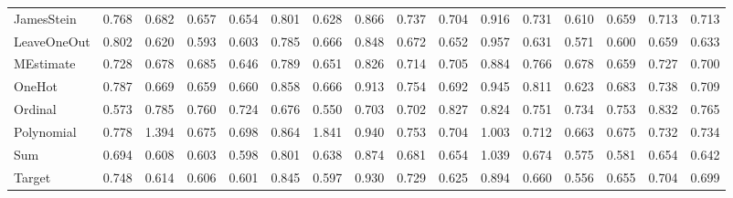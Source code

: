 \begin{tabular}{lrrrrrrrrrrrrrrr}
JamesStein         &     0.768 &             0.682 &   0.657 &    0.654 &   0.801 &    0.628 &  0.866 &   0.737 &    0.704 &    0.916 &      0.731 &      0.610 &      0.659 &           0.713 &  0.713 \\
LeaveOneOut        &     0.802 &             0.620 &   0.593 &    0.603 &   0.785 &    0.666 &  0.848 &   0.672 &    0.652 &    0.957 &      0.631 &      0.571 &      0.600 &           0.659 &  0.633 \\
MEstimate          &     0.728 &             0.678 &   0.685 &    0.646 &   0.789 &    0.651 &  0.826 &   0.714 &    0.705 &    0.884 &      0.766 &      0.678 &      0.659 &           0.727 &  0.700 \\
OneHot             &     0.787 &             0.669 &   0.659 &    0.660 &   0.858 &    0.666 &  0.913 &   0.754 &    0.692 &    0.945 &      0.811 &      0.623 &      0.683 &           0.738 &  0.709 \\
Ordinal            &     0.573 &             0.785 &   0.760 &    0.724 &   0.676 &    0.550 &  0.703 &   0.702 &    0.827 &    0.824 &      0.751 &      0.734 &      0.753 &           0.832 &  0.765 \\
Polynomial         &     0.778 &             1.394 &   0.675 &    0.698 &   0.864 &    1.841 &  0.940 &   0.753 &    0.704 &    1.003 &      0.712 &      0.663 &      0.675 &           0.732 &  0.734 \\
Sum                &     0.694 &             0.608 &   0.603 &    0.598 &   0.801 &    0.638 &  0.874 &   0.681 &    0.654 &    1.039 &      0.674 &      0.575 &      0.581 &           0.654 &  0.642 \\
Target             &     0.748 &             0.614 &   0.606 &    0.601 &   0.845 &    0.597 &  0.930 &   0.729 &    0.625 &    0.894 &      0.660 &      0.556 &      0.655 &           0.704 &  0.699 \\
\bottomrule
\end{tabular}
